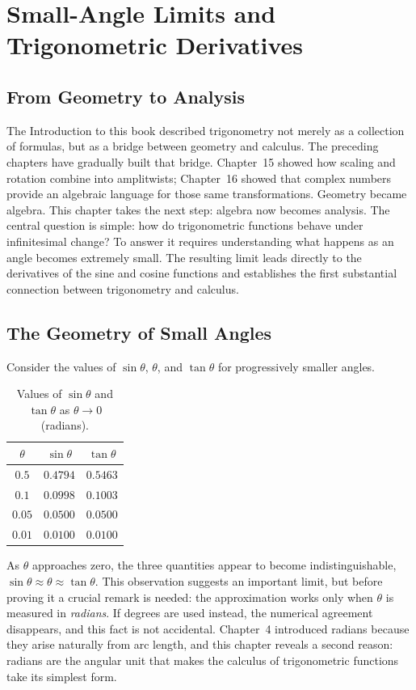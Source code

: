 \chapter{Small-Angle Limits and Trigonometric Derivatives}
\label{ch:ch17-calculus-connections}

\section{From Geometry to Analysis}

The Introduction to this book described trigonometry not merely as a
collection of formulas, but as a bridge between geometry and calculus.
The preceding chapters have gradually built that bridge. Chapter~15
showed how scaling and rotation combine into amplitwists; Chapter~16
showed that complex numbers provide an algebraic language for those same
transformations. Geometry became algebra. This chapter takes the next
step: algebra now becomes analysis. The central question is simple: how
do trigonometric functions behave under infinitesimal change? To answer
it requires understanding what happens as an angle becomes extremely
small. The resulting limit leads directly to the derivatives of the sine
and cosine functions and establishes the first substantial connection
between trigonometry and calculus.

\section{The Geometry of Small Angles}

Consider the values of $\sin\theta$, $\theta$, and $\tan\theta$ for
progressively smaller angles.

\begin{table}[h]
\centering
\begin{tabular}{c|c|c}
$\theta$ & $\sin\theta$ & $\tan\theta$\\
\hline
$0.5$ & $0.4794$ & $0.5463$\\
$0.1$ & $0.0998$ & $0.1003$\\
$0.05$ & $0.0500$ & $0.0500$\\
$0.01$ & $0.0100$ & $0.0100$
\end{tabular}
\caption{Values of $\sin\theta$ and $\tan\theta$ as $\theta \to 0$ (radians).}
\end{table}

As $\theta$ approaches zero, the three quantities appear to become
indistinguishable, $\sin\theta \approx \theta \approx \tan\theta$. This
observation suggests an important limit, but before proving it a crucial
remark is needed: the approximation works only when $\theta$ is measured
in \emph{radians}. If degrees are used instead, the numerical agreement
disappears, and this fact is not accidental. Chapter~4 introduced radians
because they arise naturally from arc length, and this chapter reveals a
second reason: radians are the angular unit that makes the calculus of
trigonometric functions take its simplest form.

